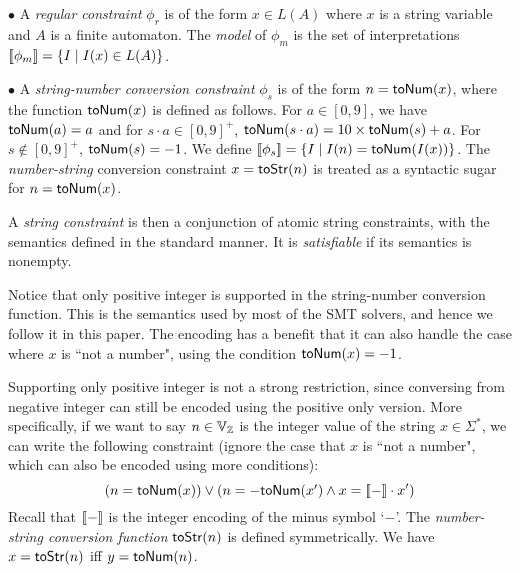 \documentclass[sigplan,review,anonymous]{acmart}\settopmatter{printfolios=true,printccs=false,printacmref=false}
\begin{document}
$\bullet$ A \emph{regular constraint} $\phi_r$ is of the form $x \in L(A)$ where $x$ is a string variable and $A$ is a finite automaton. The \emph{model} of $\phi_m$ is the set of interpretations $[\![\phi_m]\!]=\{I\mid 
I(x) \in L(A) \}$. 
\smallskip

$\bullet$ A \emph{string-number conversion constraint} $\phi_s$ is of the form $n=\mbox{\textsf{toNum}($x$)}$, where the function $\mbox{\textsf{toNum}($x$)}$ is defined as follows. For $a\in [0,9]$, we have $\mbox{\textsf{toNum}($a$)}=a$ and for $s \cdot a \in [0,9]^+$, $\mbox{\textsf{toNum}($s\cdot a$)} = 10\times \mbox{\textsf{toNum}($s$)}+a$. For $s\notin [0,9]^+$, $\mbox{\textsf{toNum}($s$)}=-1$. We define $[\![\phi_s]\!]= \{I \mid I(n)= \mbox{\textsf{toNum}($I(x)$)} \}$. The \emph{number-string} conversion constraint $x=\mbox{\textsf{toStr}($n$)}$ is treated as a syntactic sugar for $n=\mbox{\textsf{toNum}($x$)}$.
\smallskip

A \emph{string constraint} is then a conjunction of atomic string constraints, with the semantics defined in the standard manner. It is \emph{satisfiable} if its semantics is nonempty.

Notice that only positive integer is supported in the string-number conversion function. This is the semantics used by most of the SMT solvers, and hence we follow it in this paper. The encoding has a benefit that it can also handle the case where $x$ is ``not a number", using the condition $\mbox{\textsf{toNum}($x$)} = -1$.

Supporting only positive integer is not a strong restriction, since conversing from negative integer can still be encoded using the positive only version. More specifically, if we want to say $n \in \mbox{$\mathbb{V}_{\mathbb{Z}}$}$ is the integer value of the string $x \in \Sigma^*$, we can write the following constraint (ignore the case that $x$ is ``not a number", which can also be encoded using more conditions):
$$(n= \mbox{\textsf{toNum}($x$)}) \vee (n=-\mbox{\textsf{toNum}($x'$)} \wedge x = [\![-]\!]\cdot x')$$
Recall that $[\![-]\!]$ is the integer encoding of the minus symbol `$-$'. The \emph{number-string conversion function} $\mbox{\textsf{toStr}($n$)}$ is defined symmetrically. We have $x = \mbox{\textsf{toStr}($n$)}$ iff $y= \mbox{\textsf{toNum}($n$)}$. 
\end{document}
